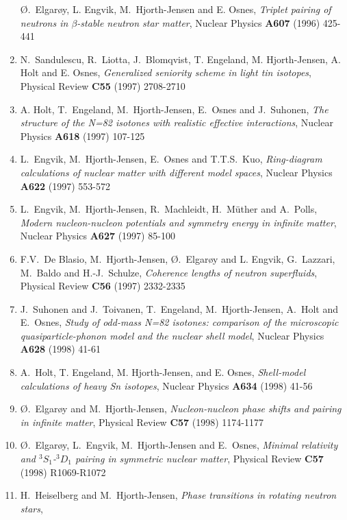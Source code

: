 \begin{enumerate}
    \O.\ Elgar\o y, L. Engvik,
    M.\ Hjorth-Jensen
    and E. Osnes,
    {\em Triplet pairing of neutrons in $\beta$-stable neutron star
         matter},
    Nuclear Physics {\bf A607} (1996) 425-441
\item
    N.\ Sandulescu, R.\ Liotta, J.\ Blomqvist,
    T. Engeland, M. Hjorth-Jensen, A. Holt and E. Osnes,
    {\em Generalized seniority scheme in light tin isotopes},
    Physical Review {\bf C55} (1997) 2708-2710
\item
    A. Holt, T.\ Engeland, M.\ Hjorth-Jensen, E.\ Osnes and J.\ Suhonen,
    {\em The structure of the N=82 isotones with realistic effective
     interactions},
    Nuclear Physics {\bf A618} (1997) 107-125
\item
    L.\ Engvik,  M.\ Hjorth-Jensen, E.\ Osnes and T.T.S.\ Kuo,
    {\em Ring-diagram calculations of nuclear matter with different
         model spaces},
    Nuclear Physics {\bf A622} (1997) 553-572 
\item    
    L.\ Engvik, M.\ Hjorth-Jensen, R.\ Machleidt, H.\ M\"uther and
    A.\ Polls,
    {\em Modern nucleon-nucleon potentials and symmetry energy in infinite
         matter},
    Nuclear Physics {\bf A627} (1997) 85-100
\item 
    F.V.\ De Blasio, 
    M.\ Hjorth-Jensen, \O.\ Elgar\o y and L. Engvik, G.\ Lazzari, M.\ Baldo
    and H.-J.\ Schulze, 
    {\em Coherence lengths of neutron superfluids},
    Physical Review {\bf C56} (1997) 2332-2335
\item
    J.\ Suhonen and J.\ Toivanen, 
    T.\ Engeland, M.\ Hjorth-Jensen, A.\ Holt and E.\ Osnes,
    {\em Study of odd-mass N=82 isotones: comparison of the microscopic
    quasiparticle-phonon model and the nuclear shell model},
    Nuclear Physics {\bf A628} (1998) 41-61
 \item
    A.\ Holt, T. Engeland, M. Hjorth-Jensen, and E. Osnes,
    {\em Shell-model calculations of heavy Sn isotopes},
    Nuclear Physics {\bf A634} (1998) 41-56
\item
    \O.\ Elgar\o y and
    M.\ Hjorth-Jensen,
    {\em Nucleon-nucleon phase shifts and pairing in infinite matter},
    Physical Review {\bf C57 } (1998) 1174-1177
\item
    \O.\ Elgar\o y, L.\ Engvik, 
    M.\ Hjorth-Jensen and E.\ Osnes,
    {\em Minimal relativity and $^3S_1$-$^3D_1$ pairing in symmetric nuclear matter},
    Physical Review {\bf C57} (1998) R1069-R1072 
\item 
    H.\ Heiselberg and M.\ Hjorth-Jensen,
    {\em Phase transitions in rotating  neutron stars}, 

\end{enumerate}
